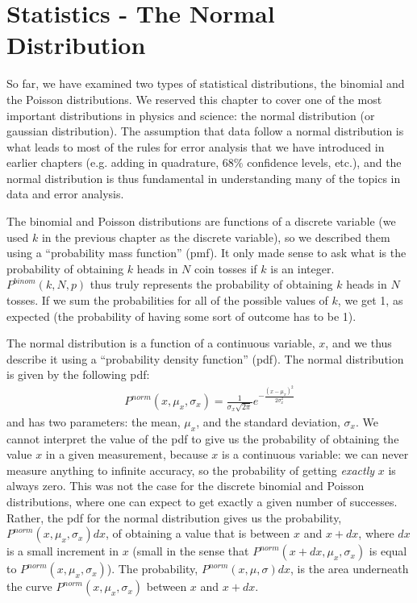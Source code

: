%
\chapter{Statistics - The Normal Distribution}
\label{chap:StatsNormal}
So far, we have examined two types of statistical distributions, the binomial and the Poisson distributions. We reserved this chapter to cover one of the most important distributions in physics and science: the normal distribution (or gaussian distribution). The assumption that data follow a normal distribution is what leads to most of the rules for error analysis that we have introduced in earlier chapters (e.g. adding in quadrature, 68\% confidence levels, etc.), and the normal distribution is thus fundamental in understanding many of the topics in data and error analysis.

The binomial and Poisson distributions are functions of a discrete variable (we used $k$ in the previous chapter as the discrete variable), so we described them using a ``probability mass function'' (pmf). It only made sense to ask what is the probability of obtaining $k$ heads in $N$ coin tosses if $k$ is an integer. $P^{binom}(k,N,p)$ thus truly represents the probability of obtaining $k$ heads in $N$ tosses. If we sum the probabilities for all of the possible values of $k$, we get 1, as expected (the probability of having some sort of outcome has to be 1). 

The normal distribution is a function of a continuous variable, $x$, and we thus describe it using a ``probability density function'' (pdf). The normal distribution is given by the following pdf:
\begin{align}
\label{eqn:gaus}
P^{norm}(x,\mu_x,\sigma_x)=\frac{1}{\sigma_x\sqrt{2\pi}}e^{-\frac{(x-\mu_x)^2}{2\sigma_x^2}}
\end{align}
and has two parameters: the mean, $\mu_x$, and the standard deviation, $\sigma_x$. We cannot interpret the value of the pdf to give us the probability of obtaining the value $x$ in a given measurement, because $x$ is a continuous variable: we can never measure anything to infinite accuracy, so the probability of getting \textit{exactly} $x$ is always zero. This was not the case for the discrete binomial and Poisson distributions, where one can expect to get exactly a given number of successes. Rather, the pdf for the normal distribution gives us the probability, $P^{norm}(x,\mu_x,\sigma_x)dx$, of obtaining a value that is between $x$ and $x+dx$, where $dx$ is a small increment in $x$ (small in the sense that $P^{norm}(x+dx,\mu_x,\sigma_x)$ is equal to $P^{norm}(x,\mu_x,\sigma_x)$). The probability, $P^{norm}(x,\mu,\sigma)dx$, is the area underneath the curve $P^{norm}(x,\mu_x,\sigma_x)$ between $x$ and $x+dx$. 

